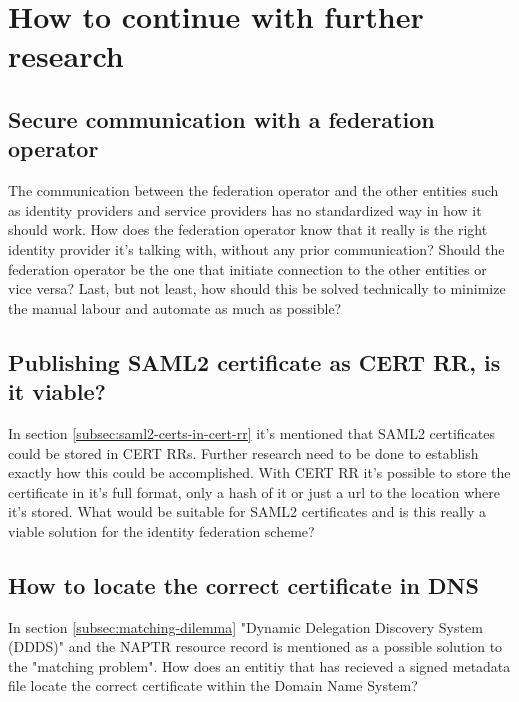 \section{How to continue with further research}
\subsection{Secure communication with a federation operator}
The communication between the federation operator and the other entities such as identity providers and service providers has no standardized way in how it should work.
How does the federation operator know that it really is the right identity provider it's talking with, without any prior communication?
Should the federation operator be the one that initiate connection to the other entities or vice versa?
Last, but not least, how should this be solved technically to minimize the manual labour and automate as much as possible?

\subsection{Publishing SAML2 certificate as CERT RR, is it viable?}
In section \ref{subsec:saml2-certs-in-cert-rr} it's mentioned that SAML2 certificates could be stored in CERT RRs.
Further research need to be done to establish exactly how this could be accomplished.
With CERT RR it's possible to store the certificate in it's full format, only a hash of it or just a url to the location where it's stored\cite[ch. 2.1]{rfc:4398}.
What would be suitable for SAML2 certificates and is this really a viable solution for the identity federation scheme?

\subsection{How to locate the correct certificate in DNS}
In section \ref{subsec:matching-dilemma} "Dynamic Delegation Discovery System (DDDS)"\cite{rfc:3401,rfc:3402,rfc:3403,rfc:3404} and the NAPTR resource record\cite{rfc:3403} is mentioned as a possible solution to the "matching problem".
How does an entitiy that has recieved a signed metadata file locate the correct certificate within the Domain Name System?


